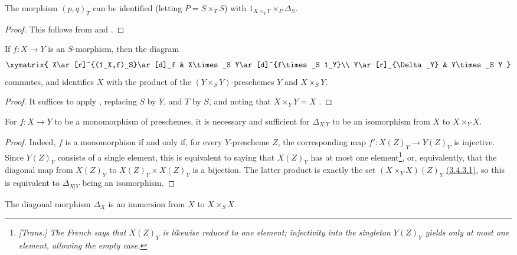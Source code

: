 \begin{corollary}[5.3.6]
\label{I.5.3.6}
The morphism $(p,q)_T$ can be identified (letting $P=S\times_T S$) with $1_{X\times_T Y}\times_P\Delta_S$.
\end{corollary}

\begin{proof}
This follows from  and .
\end{proof}

\begin{corollary}[5.3.7]
\label{I.5.3.7}
If $f:X\to Y$ is an $S$-morphism, then the diagram
\[
  \xymatrix{
    X\ar[r]^{(1_X,f)_S}\ar[d]_f &
    X\times_S Y\ar[d]^{f\times_S 1_Y}\\
    Y\ar[r]_{\Delta_Y} &
    Y\times_S Y
  }
\]
commutes, and identifies $X$ with the product of the $(Y\times_S Y)$-preschemes $Y$ and $X\times_S Y$.
\end{corollary}

\begin{proof}
It suffices to apply , replacing $S$ by $Y$, and $T$ by $S$, and noting that $X\times_Y Y=X$ .
\end{proof}

\begin{proposition}[5.3.8]
\label{I.5.3.8}
For $f:X\to Y$ to be a monomorphism of preschemes, it is necessary and sufficient for $\Delta_{X|Y}$ to be an isomorphism from $X$ to $X\times_Y X$.
\end{proposition}

\begin{proof}
Indeed, $f$ is a monomorphism if and only if, for every $Y$-prescheme $Z$, the corresponding map $f':X(Z)_Y\to Y(Z)_Y$ is injective.
Since $Y(Z)_Y$ consists of a single element, this is equivalent to saying that $X(Z)_Y$ has at most one element\footnote{\emph{[Trans.] The French says that $X(Z)_Y$ is likewise reduced to one element; injectivity into the singleton $Y(Z)_Y$ yields only at most one element, allowing the empty case.}}, or, equivalently, that the diagonal map from $X(Z)_Y$ to $X(Z)_Y\times X(Z)_Y$ is a bijection.
The latter product is exactly the set $(X\times_Y X)(Z)_Y$ \hyperref[I.3.4.3]{(3.4.3.1)}, so this is equivalent to $\Delta_{X|Y}$ being an isomorphism.
\end{proof}

\begin{proposition}[5.3.9]
\label{I.5.3.9}
The diagonal morphism $\Delta_X$ is an immersion from $X$ to $X\times_S X$.
\end{proposition}

